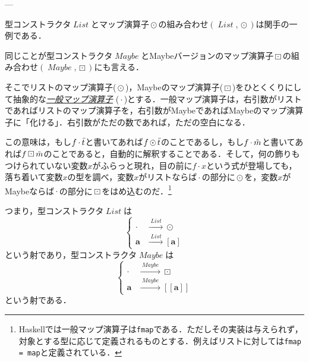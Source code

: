 \documentclass[a5paper,draft]{jsbook}
\def\[{\left[\!\left[}
\def\]{\right]\!\right]}
\newcommand{\programminglanguage}[1]{\textsf{#1}}
\newcommand{\haskell}{\programminglanguage{Haskell}}
\newcommand{\keyword}[1]{{\underline{\emph{#1}}}}
\newcommand{\code}[1]{\texttt{#1}}
\newcommand{\mathSet}[1]{\mathbf{#1}} %
\newcommand{\mathTypeParameter}[1]{\mathbf{#1}}
\newcommand{\mathTypeName}[1]{\textbf{#1}}
\newcommand{\hsklTypeParameterConstructor}[1]{\textit{#1}}
\newcommand{\mathListType}[1]{\left[#1\right]}
\newcommand{\mathListVar}[1]{\Bar{#1}}
\newcommand{\mathCategoryShort}[2]{(#1,#2)}
\DeclareMathOperator{\hsklFmap}{\cdot}
\DeclareMathOperator{\hsklListConstructor}{\hsklTypeParameterConstructor{List}}
\DeclareMathOperator{\hsklMap}{\odot}
\DeclareMathOperator{\hsklMaybeConstructor}{\hsklTypeParameterConstructor{Maybe}}
\DeclareMathOperator{\hsklMaybeMap}{\boxdot}
\newcommand{\hsklMaybeType}[1]{\[#1\]}
\newcommand{\hsklMaybe}[1]{\Tilde{#1}}
\begin{document}

---

型コンストラクタ$\hsklListConstructor$とマップ演算子$\hsklMap$の組み合わせ$(\hsklListConstructor,\hsklMap)$は関手の一例である．

同じことが型コンストラクタ$\hsklMaybeConstructor$とMaybeバージョンのマップ演算子$\hsklMaybeMap$の組み合わせ$(\hsklMaybeConstructor,\hsklMaybeMap)$にも言える．

そこでリストのマップ演算子($\hsklMap$)，Maybeのマップ演算子($\hsklMaybeMap$)をひとくくりにして抽象的な\keyword{一般マップ演算子} ($\hsklFmap$)とする．一般マップ演算子は，右引数がリストであればリストのマップ演算子を，右引数がMaybeであればMaybeのマップ演算子に「化ける」．右引数がただの数であれば，ただの空白になる．

この意味は，もし$f\hsklFmap\mathListVar{t}$と書いてあれば$f\hsklMap\mathListVar{t}$のことであるし，もし$f\hsklFmap\hsklMaybe{m}$と書いてあれば$f\hsklMaybeMap\hsklMaybe{m}$のことであると，自動的に解釈することである．そして，何の飾りもつけられていない変数$x$がふらっと現れ，目の前に$f\hsklFmap x$という式が登場しても，落ち着いて変数$x$の型を調べ，変数$x$がリストならば$\hsklFmap$の部分に$\hsklMap$を，変数$x$がMaybeならば$\hsklFmap$の部分に$\hsklMaybeMap$をはめ込むのだ．\footnote{\haskell では一般マップ演算子は\code{fmap}である．ただしその実装は与えられず，対象とする型に応じて定義されるものとする．例えばリストに対しては\code{fmap = map}と定義されている．}

つまり，型コンストラクタ$\hsklListConstructor$は
\begin{equation}
\left\{
\begin{split}
\hsklFmap&\xrightarrow{\;\hsklListConstructor\;}\hsklMap\\
\mathTypeParameter{a}&\xrightarrow{\;\hsklListConstructor\;}\mathListType{\mathTypeParameter{a}}
\end{split}
\right.
\end{equation}
という射であり，型コンストラクタ$\hsklMaybeConstructor$は
\begin{equation}
\left\{
\begin{split}
\hsklFmap&\xrightarrow{\;\hsklMaybeConstructor\;}\hsklMaybeMap\\
\mathTypeParameter{a}&\xrightarrow{\;\hsklMaybeConstructor\;}\hsklMaybeType{\mathTypeParameter{a}}
\end{split}
\right.
\end{equation}
という射である．
\end{document}
